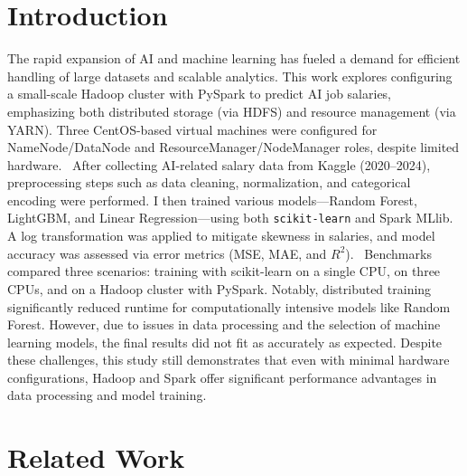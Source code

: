 \documentclass[12pt,a4paper]{article}
\begin{document}
\begin{multicols}{2}
\section{Introduction}
The rapid expansion of AI and machine learning has fueled a demand for efficient handling of large datasets and scalable analytics. This work explores configuring a small-scale Hadoop cluster with PySpark to predict AI job salaries, emphasizing both distributed storage (via HDFS) and resource management (via YARN). Three CentOS-based virtual machines were configured for NameNode/DataNode and ResourceManager/NodeManager roles, despite limited hardware.
\ 
After collecting AI-related salary data from Kaggle (2020--2024), preprocessing steps such as data cleaning, normalization, and categorical encoding were performed. I then trained various models---Random Forest, LightGBM, and Linear Regression---using both \texttt{scikit-learn} and Spark MLlib. A log transformation was applied to mitigate skewness in salaries, and model accuracy was assessed via error metrics (MSE, MAE, and $R^2$).
\   
Benchmarks compared three scenarios: training with scikit-learn on a single CPU, on three CPUs, and on a Hadoop cluster with PySpark. Notably, distributed training significantly reduced runtime for computationally intensive models like Random Forest. However, due to issues in data processing and the selection of machine learning models, the final results did not fit as accurately as expected. Despite these challenges, this study still demonstrates that even with minimal hardware configurations, Hadoop and Spark offer significant performance advantages in data processing and model training.
\section{Related Work}

\end{multicols}
\end{document}

